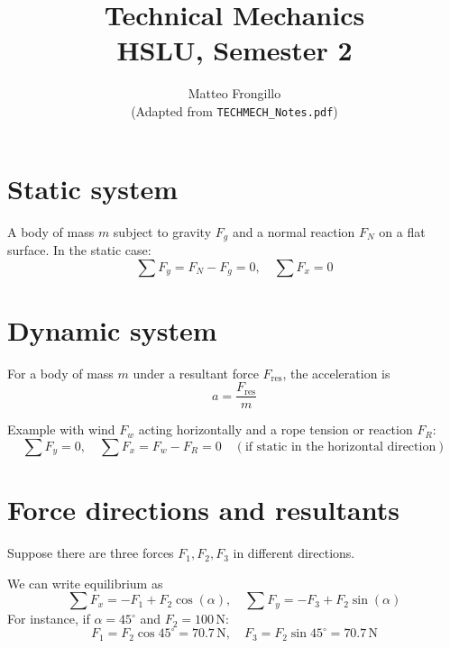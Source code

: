 \documentclass{article}
\title{\textbf{Technical Mechanics\\HSLU, Semester 2}}
\author{Matteo Frongillo\\(Adapted from \texttt{TECHMECH\_Notes.pdf})}
\date{}
\begin{document}
\maketitle
\tableofcontents
\newpage

\section{Static system}
A body of mass $m$ subject to gravity $F_g$ and a normal reaction $F_N$ on a flat surface. In the static case:
\[
\sum F_y = F_N - F_g = 0, 
\quad
\sum F_x = 0
\]

\begin{center}
\end{center}

\section{Dynamic system}
For a body of mass $m$ under a resultant force $F_{\mathrm{res}}$, the acceleration is 
\[
a = \frac{F_{\mathrm{res}}}{m}
\]

Example with wind $F_w$ acting horizontally and a rope tension or reaction $F_R$:
\[
\sum F_y = 0, 
\quad
\sum F_x = F_w - F_R = 0 \quad (\text{if static in the horizontal direction})
\]

\section{Force directions and resultants}
Suppose there are three forces $F_1, F_2, F_3$ in different directions.
\begin{center}
\end{center}
We can write equilibrium as
\[
\sum F_x = -F_1 + F_2 \cos(\alpha), 
\quad
\sum F_y = -F_3 + F_2 \sin(\alpha)
\]
For instance, if $\alpha = 45^\circ$ and $F_2 = 100\,\mathrm{N}$:
\[
F_1 = F_2 \cos 45^\circ = 70.7\,\mathrm{N}, 
\quad
F_3 = F_2 \sin 45^\circ = 70.7\,\mathrm{N}
\]
\end{document}

